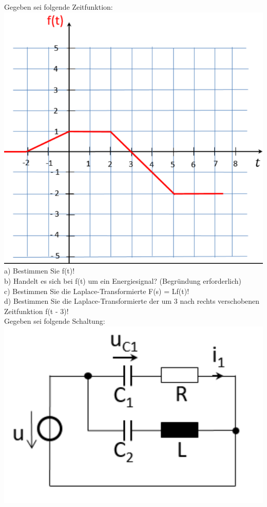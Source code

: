 \documentclass[A4]{scrartcl}
\begin{document}
  Gegeben sei folgende Zeitfunktion:\\
  \includegraphics{zeitfunktion1.png}\\
  a) Bestimmen Sie f(t)!\\
  b) Handelt es sich bei f(t) um ein Energiesignal? (Begründung erforderlich)\\
  c) Bestimmen Sie die Laplace-Transformierte F(s) = L{f(t)}!\\
  d) Bestimmen Sie die Laplace-Transformierte der um 3 nach rechts verschobenen Zeitfunktion f(t - 3)!\\
  \newpage
  Gegeben sei folgende Schaltung:\\
  \includegraphics{Schaltung1.png}\\
\end{document}
